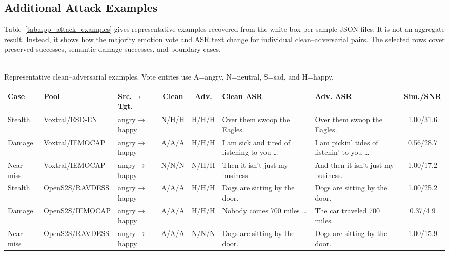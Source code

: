 \begin{samepage}
\section{Additional Attack Examples}
\label{app:additional_examples}

Table~\ref{tab:app_attack_examples} gives representative examples recovered
from the white-box per-sample JSON files.  It is not an aggregate result.
Instead, it shows how the majority emotion vote and ASR text change for
individual clean--adversarial pairs.  The selected rows cover preserved
successes, semantic-damage successes, and boundary cases.

\begin{center}
\label{tab:app_attack_examples}
{\footnotesize \MakeUppercase{\tablename}~\thetable}\\
{\scriptsize Representative clean--adversarial examples.  Vote entries use
A=angry, N=neutral, S=sad, and H=happy.}\par
\vspace{2pt}
\centering
\tiny
\setlength{\tabcolsep}{2pt}
\begin{tabularx}{\columnwidth}{l l l c c X X c}
\toprule
\textbf{Case} & \textbf{Pool} & \textbf{Src.$\rightarrow$Tgt.} & \textbf{Clean} & \textbf{Adv.} & \textbf{Clean ASR} & \textbf{Adv. ASR} & \textbf{Sim./SNR} \\
\midrule
Stealth & Voxtral/ESD-EN & angry$\rightarrow$happy & N/H/H & H/H/H & Over them swoop the Eagles. & Over them swoop the Eagles. & 1.00/31.6 \\
Damage & Voxtral/IEMOCAP & angry$\rightarrow$happy & A/A/A & H/H/H & I am sick and tired of listening to you \ldots & I am pickin' tides of listenin' to you \ldots & 0.56/28.7 \\
Near miss & Voxtral/IEMOCAP & angry$\rightarrow$happy & N/N/N & N/H/H & Then it isn't just my business. & And then it isn't just my business. & 1.00/17.2 \\
Stealth & OpenS2S/RAVDESS & angry$\rightarrow$happy & A/A/A & H/H/H & Dogs are sitting by the door. & Dogs are sitting by the door. & 1.00/25.2 \\
Damage & OpenS2S/IEMOCAP & angry$\rightarrow$happy & A/A/A & H/H/H & Nobody comes 700 miles \ldots & The car traveled 700 miles. & 0.37/4.9 \\
Near miss & OpenS2S/RAVDESS & angry$\rightarrow$happy & A/A/A & N/N/N & Dogs are sitting by the door. & Dogs are sitting by the door. & 1.00/15.9 \\
\bottomrule
\end{tabularx}
\end{center}


\end{samepage}
